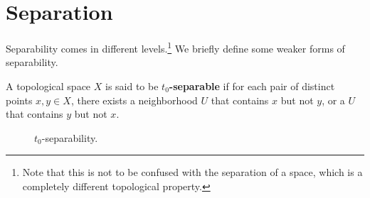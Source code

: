 \section{Separation}

  Separability comes in different levels.\footnote{Note that this is not to be confused with the separation of a space, which is a completely different topological property.} We briefly define some weaker forms of separability. 
  
  \begin{definition}[$t_0$-Separability]
    A topological space $X$ is said to be \textbf{$t_0$-separable} if for each pair of distinct points $x, y \in X$, there exists a neighborhood $U$ that contains $x$ but not $y$, or a $U$ that contains $y$ but not $x$. 

    \begin{figure}[H]
      \centering 
      \caption{$t_0$-separability. } 
      \label{fig:t0_separability}
    \end{figure}

  \end{definition}

